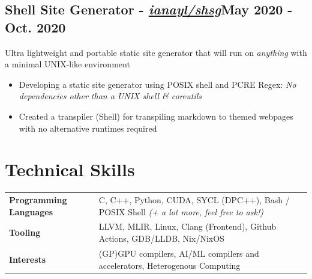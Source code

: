 \documentclass[9pt]{article}
\begin{document}
\subsection{Shell Site Generator \normalsize\textnormal{- \href{https://github.com/ianayl/shsg}{\textit{ianayl/shsg}}}\hfill \normalsize\textnormal{May 2020 - Oct. 2020}}
  Ultra lightweight and portable static site generator that will run on \textit{anything} with a minimal UNIX-like environment
\vspace{-0.5em}
\begin{itemize}
  \item Developing a static site generator using POSIX shell and PCRE Regex: \textit{No dependencies other than a UNIX shell \& coreutils}
  \item Created a transpiler (Shell) for transpiling markdown to themed webpages with no alternative runtimes required
\end{itemize}
\vspace{-1em}

\section{Technical Skills}
\begin{tabular}{ l l }
  \textbf{Programming Languages} & C, C++, Python, CUDA, SYCL (DPC++), Bash / POSIX Shell \textit{(+ a lot more, feel free to ask!)}\\
    \textbf{Tooling} & LLVM, MLIR, Linux, Clang (Frontend), Github Actions, GDB/LLDB, Nix/NixOS \\
  \textbf{Interests} & (GP)GPU compilers, AI/ML compilers and accelerators, Heterogenous Computing 
\end{tabular}
\end{document}
